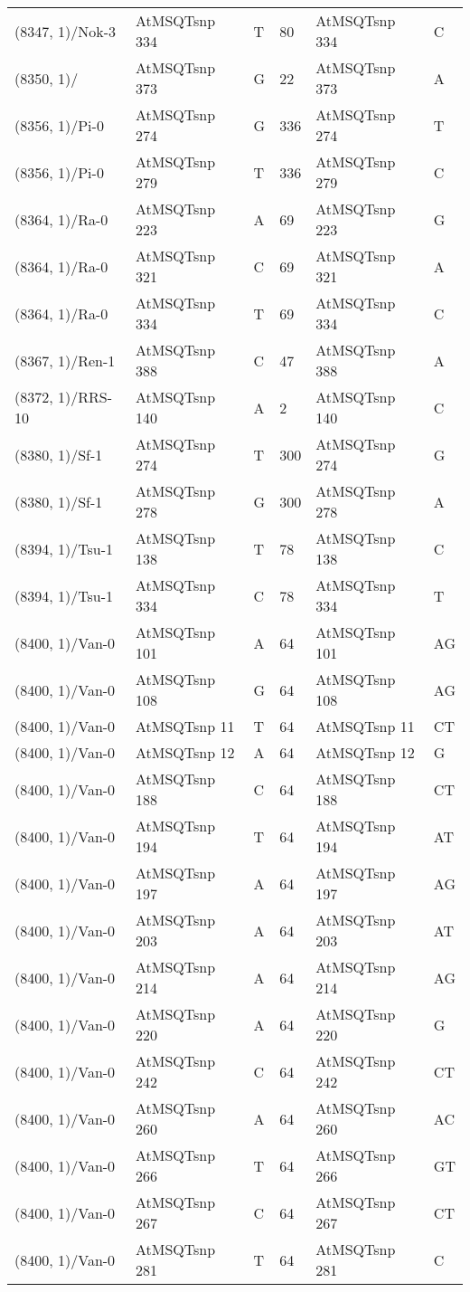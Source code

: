 \begin{center}
\begin{longtable}{|l|l|l|l|l|l|}
(8347, 1)/Nok-3&AtMSQTsnp 334&T&80&AtMSQTsnp 334&C\\
(8350, 1)/&AtMSQTsnp 373&G&22&AtMSQTsnp 373&A\\
(8356, 1)/Pi-0&AtMSQTsnp 274&G&336&AtMSQTsnp 274&T\\
(8356, 1)/Pi-0&AtMSQTsnp 279&T&336&AtMSQTsnp 279&C\\
(8364, 1)/Ra-0&AtMSQTsnp 223&A&69&AtMSQTsnp 223&G\\
(8364, 1)/Ra-0&AtMSQTsnp 321&C&69&AtMSQTsnp 321&A\\
(8364, 1)/Ra-0&AtMSQTsnp 334&T&69&AtMSQTsnp 334&C\\
(8367, 1)/Ren-1&AtMSQTsnp 388&C&47&AtMSQTsnp 388&A\\
(8372, 1)/RRS-10&AtMSQTsnp 140&A&2&AtMSQTsnp 140&C\\
(8380, 1)/Sf-1&AtMSQTsnp 274&T&300&AtMSQTsnp 274&G\\
(8380, 1)/Sf-1&AtMSQTsnp 278&G&300&AtMSQTsnp 278&A\\
(8394, 1)/Tsu-1&AtMSQTsnp 138&T&78&AtMSQTsnp 138&C\\
(8394, 1)/Tsu-1&AtMSQTsnp 334&C&78&AtMSQTsnp 334&T\\
(8400, 1)/Van-0&AtMSQTsnp 101&A&64&AtMSQTsnp 101&AG\\
(8400, 1)/Van-0&AtMSQTsnp 108&G&64&AtMSQTsnp 108&AG\\
(8400, 1)/Van-0&AtMSQTsnp 11&T&64&AtMSQTsnp 11&CT\\
(8400, 1)/Van-0&AtMSQTsnp 12&A&64&AtMSQTsnp 12&G\\
(8400, 1)/Van-0&AtMSQTsnp 188&C&64&AtMSQTsnp 188&CT\\
(8400, 1)/Van-0&AtMSQTsnp 194&T&64&AtMSQTsnp 194&AT\\
(8400, 1)/Van-0&AtMSQTsnp 197&A&64&AtMSQTsnp 197&AG\\
(8400, 1)/Van-0&AtMSQTsnp 203&A&64&AtMSQTsnp 203&AT\\
(8400, 1)/Van-0&AtMSQTsnp 214&A&64&AtMSQTsnp 214&AG\\
(8400, 1)/Van-0&AtMSQTsnp 220&A&64&AtMSQTsnp 220&G\\
(8400, 1)/Van-0&AtMSQTsnp 242&C&64&AtMSQTsnp 242&CT\\
(8400, 1)/Van-0&AtMSQTsnp 260&A&64&AtMSQTsnp 260&AC\\
(8400, 1)/Van-0&AtMSQTsnp 266&T&64&AtMSQTsnp 266&GT\\
(8400, 1)/Van-0&AtMSQTsnp 267&C&64&AtMSQTsnp 267&CT\\
(8400, 1)/Van-0&AtMSQTsnp 281&T&64&AtMSQTsnp 281&C\\

\end{longtable}
\end{center}

